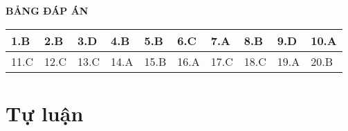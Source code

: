 \loigiai
{
	\begin{center}
		\textbf{BẢNG ĐÁP ÁN}
	\end{center}
	\begin{center}
		\begin{tabular}{|m{2.8em}|m{2.8em}|m{2.8em}|m{2.8em}|m{2.8em}|m{2.8em}|m{2.8em}|m{2.8em}|m{2.8em}|m{2.8em}|}
			\hline
			1.B  & 2.B  & 3.D  & 4.B  & 5.B  & 6.C  & 7.A  & 8.B  & 9.D  & 10.A  \\
			\hline
			11.C  & 12.C  & 13.C  & 14.A  & 15.B  & 16.A  & 17.C  & 18.C  & 19.A  & 20.B  \\
			\hline
		\end{tabular}
	\end{center}
}
\section{Tự luận}
